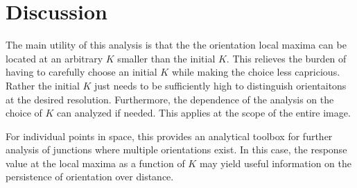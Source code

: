 \documentclass[11pt]{article} %
\begin{document}
\section{Discussion}
The main utility of this analysis is that the the orientation local maxima can be located at an arbitrary $ K $ smaller than the initial $ K $. This relieves the burden of having to carefully choose an initial $ K $ while making the choice less capricious. Rather the initial $ K $ just needs to be sufficiently high to distinguish orientaitons at the desired resolution. Furthermore, the dependence of the analysis on the choice of $ K $ can analyzed if needed. This applies at the scope of the entire image.

For individual points in space, this provides an analytical toolbox for further analysis of junctions where multiple orientations exist. In this case, the response value at the local maxima as a function of $ K $ may yield useful information on the persistence of orientation over distance. 
\end{document}
